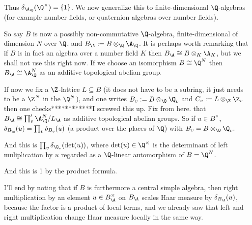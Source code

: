   Thus $\delta_{\A_{\Q}}(\Q^\times)=\{1\}$. We now generalize this to
  finite-dimensional $\Q$-algebras (for example number fields, or quaternion algebras
  over number fields).

  So say $B$ is now a possibly non-commutative $\Q$-algebra,
  finite-dimensional of dimension $N$ over $\Q$,
  and $B_{\A}:= B\otimes_{\Q}\A_{\Q}$. It is perhaps worth remarking
  that if $B$ is in fact an algebra over a number field $K$ then
  $B_{\A}\cong B\otimes_K\A_K$, but we shall not use this right now.
  If we choose an isomorphism $B\cong\Q^N$ then $B_{\A}\cong\A_{\Q}^N$
  as an additive topological abelian group.

  If now we fix a $\Z$-lattice $L\subseteq B$ (it does not have to be
  a subring, it just needs to be a $\Z^N$ in the $\Q^N$), and one writes $B_v:=B\otimes_{\Q}\Q_v$
  and $C_v:=L\otimes_{\Z}\Z_v$ then one checks************I screwed this up. Fix from here.
  that $B_{\A}\cong\prod'_v\A_{\Q}^N/L_{\A}$ as additive topological abelian groups.
  So if $u\in B^\times$, $\delta_{B_{\A}}(u)=\prod_v\delta_{B_v}(u)$
  (a product over the places of $\Q$) with $B_v=B\otimes_{\Q}\Q_v.$

  \medskip

  And this is $\prod_v\delta_{\Q_v}(\det(u))$, where $\det(u)\in\Q^\times$
  is the determinant of left muliplication by $u$ regarded as a $\Q$-linear
  automorphism of $B=\Q^N$.

  \medskip

  And this is 1 by the product formula.

  \medskip

  I'll end by noting that if $B$ is furthermore a central simple algebra,
  then right multiplication by an
  element $u\in B_{\A}^\times$ on $B_{\A}$ scales Haar measure
  by $\delta_{B_{\A}}(u)$, because the factor is a product of local terms,
  and we already saw that left and right multiplication change Haar measure
  locally in the same way.
